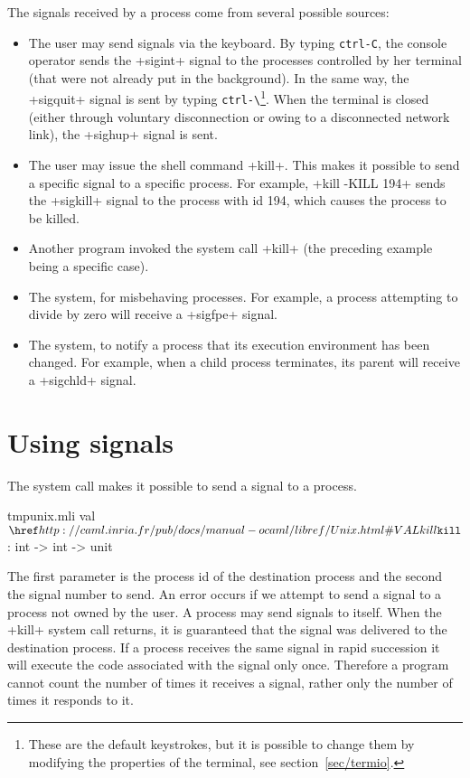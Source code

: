 The signals received by a process come from several possible sources:
%
\begin{itemize}

\item The user may send signals via the keyboard.  By typing \verb'ctrl-C',
  the console operator sends the \ml+sigint+ signal to the processes
  controlled by her terminal (that were not already put in the background).
  In the same way, the \ml+sigquit+ signal is sent by typing \verb'ctrl-\'\footnote{These 
    are the default keystrokes, but it is possible to change them by 
    modifying the properties of the terminal, see section~\ref {sec/termio}.}.  
  When the terminal is closed (either through voluntary disconnection or owing to a disconnected network link), the \ml+sighup+ signal is sent.

\item The user may issue the shell command \ml+kill+.  This makes it possible 
  to send a specific signal to a specific process.  For example, 
  \ml+kill -KILL 194+ sends the \ml+sigkill+ signal to the process with id 194, which 
  causes the process to be killed.

\item Another program invoked the system call 
  \ml+kill+ (the preceding example being a specific case).

\item The system, for misbehaving processes.  For example, a process 
  attempting to divide by zero will receive a \ml+sigfpe+ signal.

\item The system, to notify a process that its execution environment has 
  been changed.  For example, when a child process terminates, its parent 
  will receive a \ml+sigchld+ signal.

\end{itemize}


\section{\label{sec/usingsignals}Using signals}

The system call  makes it possible to send a
signal to a process.
%
\begin{listingcodefile}{tmpunix.mli}
val $\libvalue{Unix}{kill}$ : int -> int -> unit
\end{listingcodefile}
% 
The first parameter is the process id of the destination process and
the second the signal number to send. An error occurs if we attempt to
send a signal to a process not owned by the user.  A process may send
signals to itself.  When the \ml+kill+ system call returns, it is
guaranteed that the signal was delivered to the destination
process. If a process receives the same signal in rapid succession it
will execute the code associated with the signal only once.  Therefore
a program cannot count the number of times it receives a signal,
rather only the number of times it responds to it.

